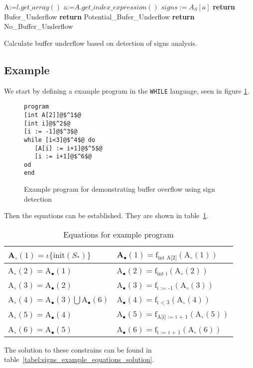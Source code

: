 \begin{algorithm}
 \begin{algorithmic}[1]
\State A:=$l.get\_array()$
\State a:=$A.get\_index\_expression()$
\State $signs:=A_S[a]$
\State \textbf{return} Bufer\_Underflow
\State \textbf{return} Potential\_Bufer\_Underflow
\Else
\State \textbf{return} No\_Buffer\_Underflow
\EndIf 
 \EndProcedure
 \end{algorithmic}
 \caption{Calculate buffer underflow based on detection of signs analysis.}
 \label{algorithm:bufferoverflow1}
\end{algorithm}

\subsection{Example}
We start by defining a example program in the \texttt{WHILE} language, seen in figure \ref{code:array_example}.\\
\begin{figure}
  \begin{lstlisting}
program
[int A[2]]@$^1$@
[int i]@$^2$@
[i := -1]@$^3$@
while [i<3]@$^4$@ do
   [A[i] := i+1]@$^5$@
   [i := i+1]@$^6$@
od
end
 \end{lstlisting}
 \caption{Example program for demonstrating buffer overflow using sign detection}
 \label{code:array_example}
\end{figure}
Then the equations can be established. They are shown in table~\ref{tabel:signs_example_equations}.\\
\begin{table}
\begin{tabular}{| l | l |}
\hline
A$_\circ (1) = \iota \{\text{init}(S_*) \} $ & A$_\bullet(1) = \text{f}_{\text{int A[2]}} (\text{A}_\circ (1))$ \\
\hline
A$_\circ (2) =$A$_\bullet(1) $ & A$_\bullet(2) = \text{f}_{\text{int i}} (\text{A}_\circ (2))$ \\
\hline
A$_\circ (3) = $A$_\bullet(2)$ & A$_\bullet(3) = \text{f}_{\text{i := -1}} (\text{A}_\circ (3))$  \\
\hline
A$_\circ (4) = $A$_\bullet(3) \bigcup $A$_\bullet(6) $ & A$_\bullet(4) = \text{f}_{\text{i < 3}} (\text{A}_\circ (4))$ \\
\hline
A$_\circ (5) = $A$_\bullet(4)$ & A$_\bullet(5) = \text{f}_{\text{A[i] := i + 1}} (\text{A}_\circ (5))$ \\
\hline
A$_\circ (6) = $A$_\bullet(5)$ & A$_\bullet(6) = \text{f}_{\text{i := i + 1}} (\text{A}_\circ (6))$ \\
\hline
\end{tabular}
\centering
\caption{Equations for example program}
\label{tabel:signs_example_equations}
\end{table}
The solution to these constrains can be found in table~\ref{tabel:signs_example_equations_solution}.



